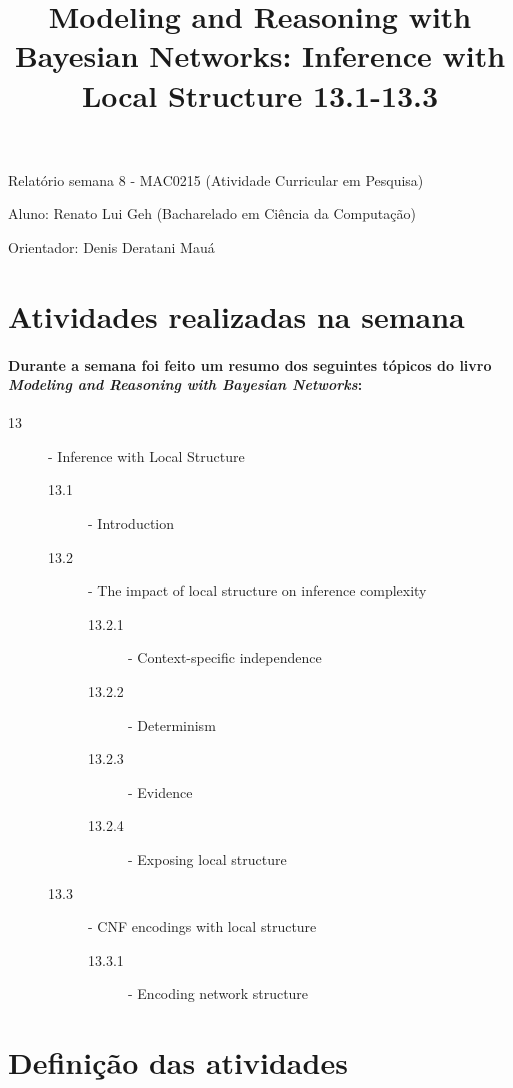 \documentclass[a4paper,10pt]{article}
\title{\textbf{Modeling and Reasoning with Bayesian Networks: Inference with Local Structure 13.1-13.3}}
\theoremstyle{plain}
\begin{document}
\date{}
\author{}
\vspace*{-40pt}
{\let\newpage\relax\maketitle}

Relatório semana 8 - MAC0215 (Atividade Curricular em Pesquisa)

Aluno: Renato Lui Geh (Bacharelado em Ciência da Computação)

Orientador: Denis Deratani Mauá

\section{Atividades realizadas na semana}

\paragraph{
  Durante a semana foi feito um resumo dos seguintes tópicos do livro \textit{Modeling and Reasoning with
  Bayesian Networks}\cite{bayes-net-darwiche}:
}

\begin{description}
  \item[13] - Inference with Local Structure
    \begin{description}
      \item[13.1] - Introduction
      \item[13.2] - The impact of local structure on inference complexity
        \begin{description}
          \item[13.2.1] - Context-specific independence
          \item[13.2.2] - Determinism
          \item[13.2.3] - Evidence
          \item[13.2.4] - Exposing local structure
        \end{description}
      \item[13.3] - CNF encodings with local structure
        \begin{description}
          \item[13.3.1] - Encoding network structure
        \end{description}
    \end{description}
\end{description}

\section{Definição das atividades}
\end{document}

